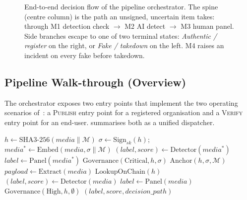 \documentclass[11pt,a4paper]{article}
\theoremstyle{definition}
\theoremstyle{plain}
\theoremstyle{remark}
\begin{document}
\begin{figure}[!ht]
\caption{End-to-end decision flow of the pipeline orchestrator.
The spine (centre column) is the path an unsigned, uncertain item
takes: through M1 detection check $\rightarrow$ M2 AI detect
$\rightarrow$ M3 human panel. Side branches escape to one of two
terminal states: \emph{Authentic / register} on the right, or
\emph{Fake / takedown} on the left. M4 raises an incident on every
fake before takedown.}\label{fig:flow}
\end{figure}

\subsection{Pipeline Walk-through (Overview)}\label{sec:pipeline}

The orchestrator exposes two entry points that implement the two
operating scenarios of~\cite{bib4}: a \textsc{Publish} entry point for
a registered organisation and a \textsc{Verify} entry point for an
end-user.  summarises both as a unified
dispatcher.

\begin{algorithm}[!ht]
\caption{Unified pipeline dispatcher
(condensed).}\label{alg:pipeline-summary}
\begin{algorithmic}[1]
    \State $h \gets \mathrm{SHA3\text{-}256}(media \parallel \mathcal{M})$
    \State $\sigma \gets \mathrm{Sign}_{\mathit{sk}}(h)$;\quad
           $media^{*} \gets \mathrm{Embed}(media, \sigma \parallel \mathcal{M})$
    \State $(label, score) \gets \mathrm{Detector}(media^{*})$
        \State $label \gets \mathrm{Panel}(media^{*})$
    \EndIf
        \State \Return $\mathrm{Governance}(\mathrm{Critical}, h, \sigma)$
    \EndIf
    \State \Return $\mathrm{Anchor}(h, \sigma, \mathcal{M})$  
\EndFunction
\Statex
{}
    \State $payload \gets \mathrm{Extract}(media)$
        \State \Return $\mathrm{LookupOnChain}(h)$
    \EndIf
    \State $(label, score) \gets \mathrm{Detector}(media)$
     \quad $label \gets \mathrm{Panel}(media)$ \EndIf
     \quad $\mathrm{Governance}(\mathrm{High}, h, \emptyset)$ \EndIf
    \State \Return $(label, score, decision\_path)$
\EndFunction
\end{algorithmic}
\end{algorithm}
\end{document}
